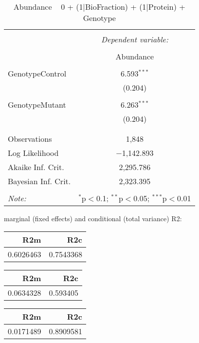 \documentclass[11pt]{report}
\begin{document}
\begin{table}[!htbp] \centering 
  \caption{Abundance ~ 0 + (1|BioFraction) + (1|Protein) + Genotype} 
  \label{} 
\begin{tabular}{@{\extracolsep{5pt}}lc} 
\\[-1.8ex]\hline 
\hline \\[-1.8ex] 
 & \multicolumn{1}{c}{\textit{Dependent variable:}} \\ 
\cline{2-2} 
\\[-1.8ex] & Abundance \\ 
\hline \\[-1.8ex] 
 GenotypeControl & 6.593$^{***}$ \\ 
  & (0.204) \\ 
  & \\ 
 GenotypeMutant & 6.263$^{***}$ \\ 
  & (0.204) \\ 
  & \\ 
\hline \\[-1.8ex] 
Observations & 1,848 \\ 
Log Likelihood & $-$1,142.893 \\ 
Akaike Inf. Crit. & 2,295.786 \\ 
Bayesian Inf. Crit. & 2,323.395 \\ 
\hline 
\hline \\[-1.8ex] 
\textit{Note:}  & \multicolumn{1}{r}{$^{*}$p$<$0.1; $^{**}$p$<$0.05; $^{***}$p$<$0.01} \\ 
\end{tabular} 
\end{table} 
marginal (fixed effects) and conditional (total variance) R2:

\begin{tabular}{r|r}
\hline
R2m & R2c\\
\hline
0.6026463 & 0.7543368\\
\hline
\end{tabular}

\begin{tabular}{r|r}
\hline
R2m & R2c\\
\hline
0.0634328 & 0.593405\\
\hline
\end{tabular}

\begin{tabular}{r|r}
\hline
R2m & R2c\\
\hline
0.0171489 & 0.8909581\\
\hline
\end{tabular}
\end{document}
